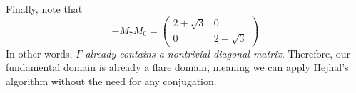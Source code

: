 \documentclass[]{article}
\begin{document}
Finally, note that
$$
-M_7M_0 =
\begin{pmatrix}
	2 + \sqrt{3} & 0 \\
	0 & 2 - \sqrt{3}
\end{pmatrix}
$$
In other words, $\Gamma$ \textit{already contains a nontrivial diagonal matrix}.
Therefore, our fundamental domain is already a flare domain, meaning we can apply Hejhal's algorithm without the need for any conjugation.

	\pagebreak
	
	\printbibliography
	
\end{document}
